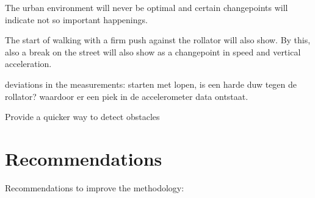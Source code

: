 The urban environment will never be optimal and certain changepoints will indicate not so important happenings. 

The start of walking with a firm push against the rollator will also show. By this, also a break on the street will also show as a changepoint in speed and vertical acceleration.

deviations in the measurements:
starten met lopen, is een harde duw tegen de rollator? waardoor er een piek in de accelerometer data ontstaat. 



Provide a quicker way to detect obstacles


\section{Recommendations} %
Recommendations to improve the methodology:
